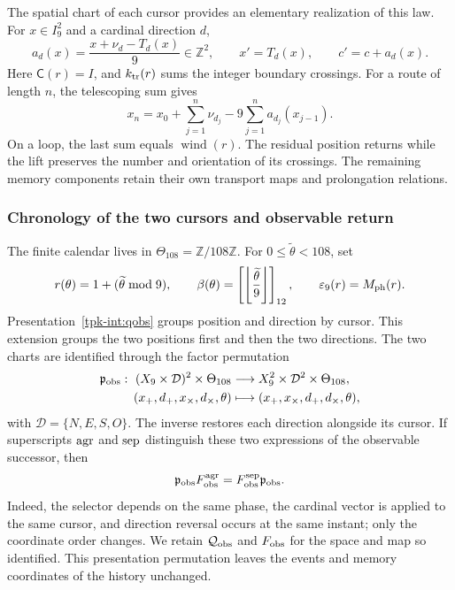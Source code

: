 The spatial chart of each cursor provides an elementary realization
of this law. For \(x\in I_9^2\) and a cardinal direction \(d\),
\[
 a_d(x)=\frac{x+\nu_d-T_d(x)}9\in\mathbb Z^2,
 \qquad x'=T_d(x),\qquad c'=c+a_d(x).
\]
Here \(\mathsf C(r)=I\), and \(k_{\rm tr}(r)\) sums the
integer boundary crossings. For a route of length \(n\),
the telescoping sum gives
\[
 x_n=x_0+\sum_{j=1}^n\nu_{d_j}
             -9\sum_{j=1}^n a_{d_j}(x_{j-1}).
\]
On a loop, the last sum equals
\(\operatorname{wind}(r)\). The residual position returns while
the lift preserves the number and orientation of its crossings.
The remaining memory components retain their own transport
maps and prolongation relations.

\subsubsection{Chronology of the two cursors and observable return}

The finite calendar lives in \(\Theta_{108}=\mathbb Z/108\mathbb Z\).
For \(0\leq\widetilde\theta<108\), set
\[
 r(\theta)=1+(\widetilde\theta\bmod9),\qquad
 \beta(\theta)=\left[\left\lfloor\frac{\widetilde\theta}{9}
 \right\rfloor\right]_{12},\qquad
 \varepsilon_9(r)=M_{\rm ph}(r).
\]
Presentation~\eqref{tpk-int:qobs} groups position and direction by
cursor. This extension groups the two positions first and
then the two directions. The two charts are identified through the
factor permutation
\begin{equation}
 \begin{aligned}
 \mathfrak p_{\rm obs}:\ (X_9\times\mathcal D)^2\times\Theta_{108}
 &\longrightarrow X_9^2\times\mathcal D^2\times\Theta_{108},\\
 (x_+,d_+,x_\times,d_\times,\theta)
 &\longmapsto(x_+,x_\times,d_+,d_\times,\theta),
 \end{aligned}
 \label{ii:permutacion-coordenadas-observables}
\end{equation}
with \(\mathcal D=\{N,E,S,O\}\). The inverse restores each direction alongside
its cursor. If superscripts \({\rm agr}\) and \({\rm sep}\) distinguish
these two expressions of the observable successor, then
\[
 \mathfrak p_{\rm obs}F_{\rm obs}^{\rm agr}
 =F_{\rm obs}^{\rm sep}\mathfrak p_{\rm obs}.
\]
Indeed, the selector depends on the same phase, the cardinal vector is
applied to the same cursor, and direction reversal occurs at the same
instant; only the coordinate order changes. We retain
\(\mathcal Q_{\rm obs}\) and \(F_{\rm obs}\) for the space and
map so identified. This presentation permutation leaves
the events and memory coordinates of the history unchanged.

